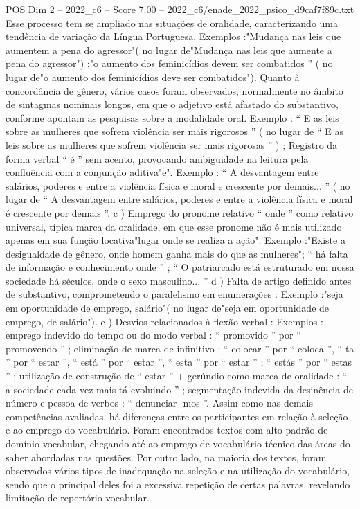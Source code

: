 \begin{textsample}{POS Dim 2 – 2022\_c6 – Score 7.00 – 2022\_c6/enade\_2022\_psico\_d9caf7f89c.txt}
Esse processo tem se ampliado nas situações de oralidade, caracterizando uma tendência de variação da Língua Portuguesa.
Exemplos :"Mudança nas leis que aumentem a pena do agressor"( no lugar de"Mudança nas leis que aumente a pena do agressor") ;"o aumento dos feminicídios devem ser combatidos ” ( no lugar de"o aumento dos feminicídios deve ser combatidos").
Quanto à concordância de gênero, vários casos foram observados, normalmente no âmbito de sintagmas nominais longos, em que o adjetivo está afastado do substantivo, conforme apontam as pesquisas sobre a modalidade oral.
Exemplo : “ E as leis sobre as mulheres que sofrem violência ser mais rigorosos ” ( no lugar de “ E as leis sobre as mulheres que sofrem violência ser mais rigorosas ” ) ; Registro da forma verbal “ é ” sem acento, provocando ambiguidade na leitura pela confluência com a conjunção aditiva"e".
Exemplo : “ A desvantagem entre salários, poderes e entre a violência física e moral e crescente por demais... ” ( no lugar de “ A desvantagem entre salários, poderes e entre a violência física e moral é crescente por demais ”. c ) Emprego do pronome relativo “ onde ” como relativo universal, típica marca da oralidade, em que esse pronome não é mais utilizado apenas em sua função locativa"lugar onde se realiza a ação".
Exemplo :"Existe a desigualdade de gênero, onde homem ganha mais do que as mulheres"; “ há falta de informação e conhecimento onde ” ; “ O patriarcado está estruturado em nossa sociedade há séculos, onde o sexo masculino... ” d ) Falta de artigo definido antes de substantivo, comprometendo o paralelismo em enumerações : Exemplo :"seja em oportunidade de emprego, salário"( no lugar de"seja em oportunidade de emprego, de salário"). e ) Desvios relacionados à flexão verbal : Exemplos : emprego indevido do tempo ou do modo verbal : “ promovido ” por “ promovendo ” ; eliminação de marca de infinitivo : “ colocar ” por “ coloca ”, “ ta ” por “ estar ”, “ está ” por “ estar ”, “ esta ” por “ estar ” ; “ estás ” por “ estas ” ; utilização de construção de “ estar ” + gerúndio como marca de oralidade : “ a sociedade cada vez mais tá evoluindo ” ; segmentação indevida da desinência de número e pessoa de verbos : “ denunciar -mos ”.
Assim como nas demais competências avaliadas, há diferenças entre os participantes em relação à seleção e ao emprego do vocabulário.
Foram encontrados textos com alto padrão de domínio vocabular, chegando até ao emprego de vocabulário técnico das áreas do saber abordadas nas questões.
Por outro lado, na maioria dos textos, foram observados vários tipos de inadequação na seleção e na utilização do vocabulário, sendo que o principal deles foi a excessiva repetição de certas palavras, revelando limitação de repertório vocabular.

\end{textsample}
